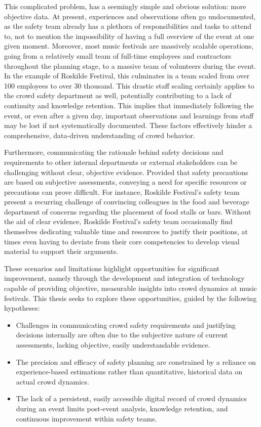 This complicated problem, has a seemingly simple and obvious solution: more objective data. At present, experiences and observations often go undocumented, as the safety team already has a plethora of responsibilities and tasks to attend to, not to mention the impossibility of having a full overview of the event at one given moment. Moreover, most music festivals are massively scalable operations, going from a relatively small team of full-time employees and contractors throughout the planning stage, to a massive team of volunteers during the event. In the example of Roskilde Festival, this culminates in a team scaled from over 100 employees to over 30 thousand. This drastic staff scaling certainly applies to the crowd safety department as well, potentially contributing to a lack of continuity and knowledge retention. This implies that immediately following the event, or even after a given day, important observations and learnings from staff may be lost if not systematically documented. These factors effectively hinder a comprehensive, data-driven understanding of crowd behavior.

Furthermore, communicating the rationale behind safety decisions and requirements to other internal departments or external stakeholders can be challenging without clear, objective evidence. Provided that safety precautions are based on subjective assessments, conveying a need for specific resources or precautions can prove difficult. For instance, Roskilde Festival's safety team present a recurring challenge of convincing colleagues in the food and beverage department of concerns regarding the placement of food stalls or bars. Without the aid of clear evidence, Roskilde Festival's safety team occasionally find themselves dedicating valuable time and resources to justify their positions, at times even having to deviate from their core competencies to develop visual material to support their arguments.

These scenarios and limitations highlight opportunities for significant improvement, namely through the development and integration of technology capable of providing objective, measurable insights into crowd dynamics at music festivals. This thesis seeks to explore these opportunities, guided by the following hypotheses:

\begin{itemize}
  \item Challenges in communicating crowd safety requirements and justifying decisions internally are often due to the subjective nature of current assessments, lacking objective, easily understandable evidence.

  \item The precision and efficacy of safety planning are constrained by a reliance on experience-based estimations rather than quantitative, historical data on actual crowd dynamics.

  \item The lack of a persistent, easily accessible digital record of crowd dynamics during an event limits post-event analysis, knowledge retention, and continuous improvement within safety teams.
\end{itemize}

